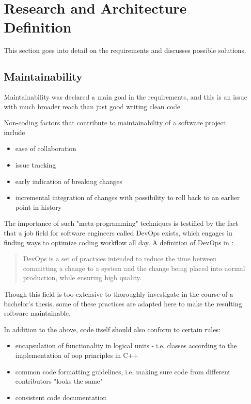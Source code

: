 \chapter{Research and Architecture Definition}
This section goes into detail on the requirements and discusses possible solutions.
\section{Maintainability}
Maintainability was declared a main goal in the requirements, and this is an issue with much broader reach than just good writing clean code.

Non-coding factors that contribute to maintainability of a software project include
\begin{itemize}
	\item ease of collaboration
	\item issue tracking
	\item early indication of breaking changes
	\item incremental integration of changes with possibility to roll back to an earlier point in history
\end{itemize}

The importance of such "meta-programming" techniques is testified by the fact that a job field for software engineers called \gls{DevOps} exists, which engages in finding ways to optimize coding workflow all day.
A definition of DevOps in \citet{Bass2015}:
\begin{quote}
	DevOps is a set of practices intended to reduce the time between committing a change to a system and the change being placed into normal production, while ensuring high quality.
\end{quote}

Though this field is too extensive to thoroughly investigate in the course of a bachelor's thesis, some of these practices are adapted here to make the resulting software maintainable.

In addition to the above, code itself should also conform to certain rules:
\begin{itemize}
	\item encapsulation of functionality in logical units - i.e. classes according to the implementation of \gls{oop} principles in C++
	\item common code formatting guidelines, i.e. making sure code from different contributors "looks the same"
	\item consistent code documentation
\end{itemize}

